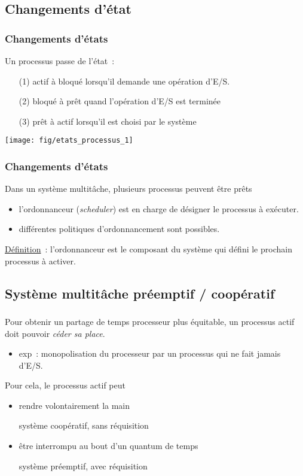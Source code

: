 \subsection{Changements d'état}
\begin{frame}
  \frametitle{Changements d'états}
Un processus passe de l'état~:
\begin{itemize}
\item[\small(1)] \alert{actif} à \alert{bloqué} lorsqu'il demande une opération d'E/S.
\item[\small(2)] \alert{bloqué} à \alert{prêt} quand l'opération d'E/S est terminée
\item[\small(3)] \alert{prêt} à \alert{actif} lorsqu'il est choisi par le système 
\end{itemize}

\begin{minipage}[t]{\linewidth}
  \center
  \texttt{[image: fig/etats\_processus\_1]}
\end{minipage}
\end{frame}

\begin{frame}
  \frametitle{Changements d'états}
Dans un système multitâche, plusieurs processus peuvent être prêts
\begin{itemize}
\item l'\alert{ordonnanceur} (\emph{scheduler}) est en charge de désigner le processus à exécuter.
\item différentes \alert{politiques d'ordonnancement} sont possibles.
\end{itemize}
\vspace{0.5cm}
\underline{Définition}~: l'\alert{ordonnanceur} est le composant du système qui
défini le prochain processus à activer.

\end{frame}

\subsection{Système multitâche préemptif / coopératif}
\begin{frame}
  \frametitle{\insertsubsection} 
  Pour obtenir un partage de temps processeur plus équitable, un processus actif doit
  pouvoir \emph{céder sa place}.
  \begin{itemize}
  \item exp~: monopolisation du processeur par un processus qui ne fait jamais d'E/S. 
  \end{itemize}
   \vspace{0.5cm}

  Pour cela, le \alert{processus actif} peut 
  \begin{itemize}
  \item \alert{rendre volontairement la main} 
  \item[\ding{212}] système \alert{coopératif}, sans réquisition
  \item \alert{être interrompu} au bout d'un \alert{quantum de temps} 
  \item[\ding{212}] système \alert{préemptif}, avec réquisition  
  \end{itemize}
\end{frame}

